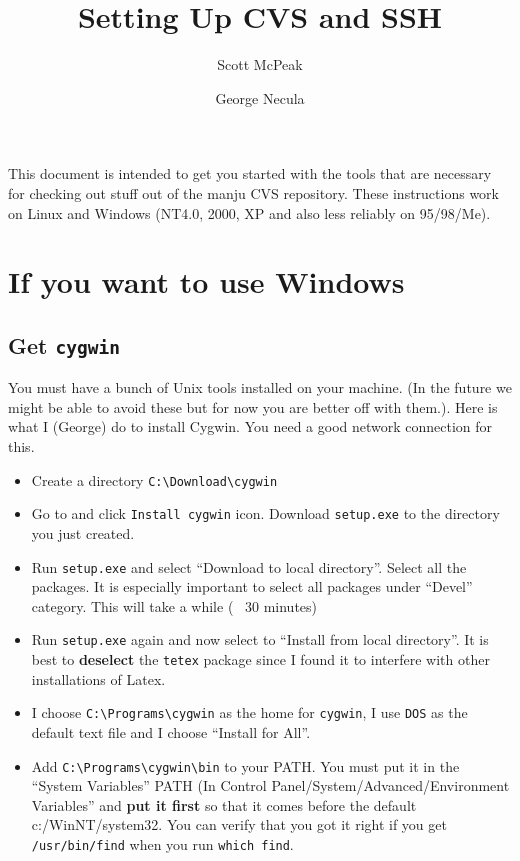 \documentclass{article}
\title{Setting Up CVS and SSH}
\author{Scott McPeak \and George Necula}
\def\t#1{{\tt #1}}
\def\cvshost{manju}
\begin{document}
\maketitle

 This document is intended to get you started with the tools that are
necessary for checking out stuff out of the \cvshost{} CVS repository. These
instructions work on Linux and Windows (NT4.0, 2000, XP and also less reliably
on 95/98/Me).

\section{If you want to use Windows}

 \subsection{Get \t{cygwin}}

 You must have a bunch of Unix tools installed on your machine. (In the future
we might be able to avoid these but for now you are better off with them.).
Here is what I (George) do to install Cygwin. You need a good network
connection for this. 
\begin{itemize}
\item Create a directory \t{C:\backslash Download\backslash cygwin}
\item Go to  and click \t{Install
cygwin} icon. Download \t{setup.exe} to the directory you just created.
\item Run \t{setup.exe} and select ``Download to local directory''. Select all
the packages. It is especially important to select all packages under
``Devel'' category. This will take a while (~ 30 minutes)
\item Run \t{setup.exe} again and now select to ``Install from local
directory''. It is best to {\bf deselect} the \t{tetex} package since I found
it to interfere with other installations of Latex.
\item I choose \t{C:\backslash Programs\backslash cygwin} 
as the home for \t{cygwin}, I use \t{DOS} as the default text file and I
choose ``Install for All''. 
\item Add \t{C:\backslash Programs\backslash cygwin\backslash bin} to your
PATH. You must put it in the ``System Variables'' PATH (In Control Panel/System/Advanced/Environment
Variables'' and {\bf put it first} so that it comes before the default
c:/WinNT/system32. You can verify that you got it right if you get
\t{/usr/bin/find} when you run \t{which find}. 
\end{itemize}
\end{document}
